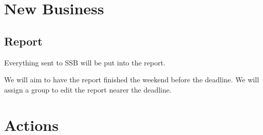 \documentclass[a4paper,11pt,twoside,class=meetingmins,crop=false]{standalone}
\begin{document}
\section{New Business}
\begin{items}
    \section{Report}
        \item Everything sent to SSB will be put into the report.
        \item We will aim to have the report finished the weekend before the deadline. We will assign a group to edit the report nearer the deadline.
\end{items}

\vspace{1em}
\vspace{1em}

\section{Actions}
\begin{items}
\end{items}
\end{document}

